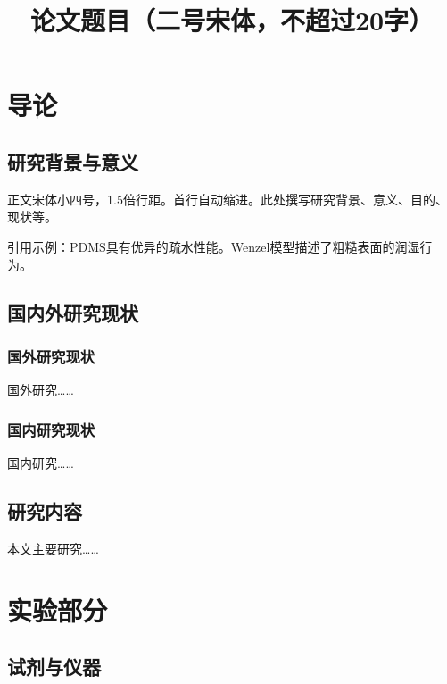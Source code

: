 \documentclass[12pt,a4paper]{swuthesis}
\title{论文题目（二号宋体，不超过20字）}
\begin{document}
\maketitle           %
\makedeclaration     %
\makecontents        %
\makeabstract        %

\section{导论}

\subsection{研究背景与意义}

正文宋体小四号，1.5倍行距。首行自动缩进。此处撰写研究背景、意义、目的、现状等。

引用示例：PDMS具有优异的疏水性能。Wenzel模型描述了粗糙表面的润湿行为。

\subsection{国内外研究现状}

\subsubsection{国外研究现状}

国外研究……

\subsubsection{国内研究现状}

国内研究……

\subsection{研究内容}

本文主要研究……

\newpage
\section{实验部分}

\subsection{试剂与仪器}
\end{document}
